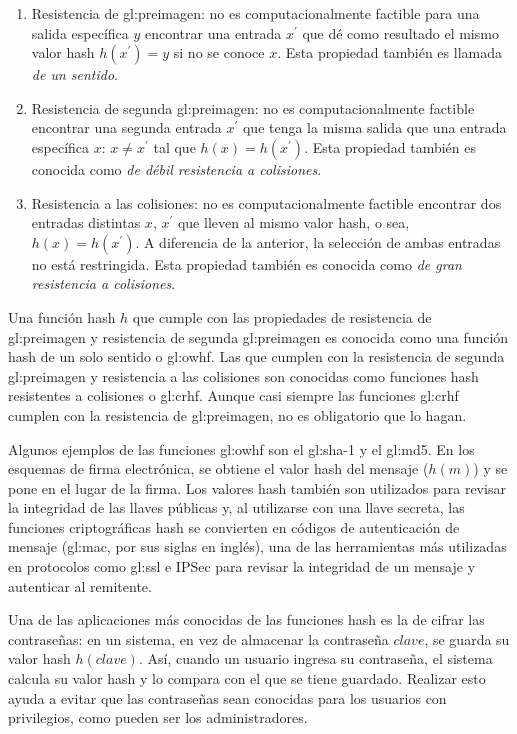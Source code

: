 \begin{enumerate}

  \item Resistencia de \gls{gl:preimagen}: no es computacionalmente factible
    para una salida específica $y$ encontrar una entrada $x^\prime$ que
    dé como resultado el mismo valor hash $h(x^\prime) = y$ si no se
    conoce $x$. Esta propiedad también es llamada
    \textit{de un sentido}.
  \item Resistencia de segunda \gls{gl:preimagen}: no es computacionalmente
    factible encontrar una segunda entrada $x^\prime$  que tenga la
    misma salida que una entrada específica $x$: $x \neq x^\prime$
    tal que $h(x) = h(x^\prime)$. Esta propiedad también es conocida
    como \textit{de débil resistencia a colisiones}.
  \item Resistencia a las colisiones: no es computacionalmente factible
    encontrar dos entradas distintas $x$, $x^\prime$ que lleven al
    mismo valor hash, o sea, $h(x) = h(x^\prime)$. A diferencia de la
    anterior, la selección de ambas entradas no está restringida. Esta
    propiedad también es conocida como
    \textit{de gran resistencia a colisiones}.
\end{enumerate}

Una función hash $h$ que cumple con las propiedades de resistencia de
\gls{gl:preimagen} y resistencia de segunda \gls{gl:preimagen} es conocida como
una función hash de un solo sentido o \gls{gl:owhf}.
Las que cumplen con la resistencia de segunda \gls{gl:preimagen} y
resistencia a las colisiones son conocidas como funciones hash
resistentes a colisiones o \gls{gl:crhf}. Aunque casi siempre las
funciones \gls{gl:crhf} cumplen con la resistencia de \gls{gl:preimagen},
no es obligatorio que lo hagan.

Algunos ejemplos de las funciones \gls{gl:owhf} son el \gls{gl:sha}-1
y el \gls{gl:md5}. En los esquemas de firma electrónica, se obtiene el
valor hash del mensaje ($h(m)$) y se pone en el lugar de la firma. Los valores
hash también son utilizados para revisar la integridad de las llaves
públicas y, al utilizarse con una llave secreta, las funciones
criptográficas hash se convierten en códigos de autenticación de mensaje
(\gls{gl:mac}, por sus siglas en inglés), una de las herramientas más
utilizadas en protocolos como \gls{gl:ssl} e IPSec para revisar la
integridad de un mensaje y autenticar al remitente.

Una de las aplicaciones más conocidas de las funciones hash es la de
cifrar las contraseñas: en un sistema, en vez de almacenar la contraseña
$clave$, se guarda su valor hash $h(clave)$. Así, cuando un usuario
ingresa su contraseña, el sistema calcula su valor hash y lo compara con
el que se tiene guardado. Realizar esto ayuda a evitar que las
contraseñas sean conocidas para los usuarios con privilegios, como
pueden ser los administradores.

